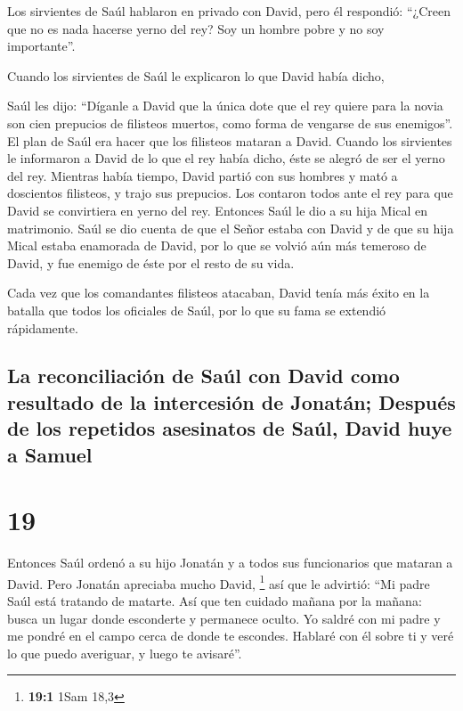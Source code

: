  Los sirvientes de Saúl hablaron en privado con David,
pero él respondió: ``¿Creen que no es nada hacerse yerno del rey? Soy un
hombre pobre y no soy importante''.

 Cuando los sirvientes de Saúl le explicaron lo que David
había dicho,

 Saúl les dijo: ``Díganle a David que la única dote que
el rey quiere para la novia son cien prepucios de filisteos muertos,
como forma de vengarse de sus enemigos''. El plan de Saúl era hacer que
los filisteos mataran a David.  Cuando los sirvientes le
informaron a David de lo que el rey había dicho, éste se alegró de ser
el yerno del rey. Mientras había tiempo,  David partió
con sus hombres y mató a doscientos filisteos, y trajo sus prepucios.
Los contaron todos ante el rey para que David se convirtiera en yerno
del rey. Entonces Saúl le dio a su hija Mical en matrimonio.
 Saúl se dio cuenta de que el Señor estaba con David y de
que su hija Mical estaba enamorada de David,  por lo que
se volvió aún más temeroso de David, y fue enemigo de éste por el resto
de su vida.

 Cada vez que los comandantes filisteos atacaban, David
tenía más éxito en la batalla que todos los oficiales de Saúl, por lo
que su fama se extendió rápidamente.

\hypertarget{la-reconciliaciuxf3n-de-sauxfal-con-david-como-resultado-de-la-intercesiuxf3n-de-jonatuxe1n-despuuxe9s-de-los-repetidos-asesinatos-de-sauxfal-david-huye-a-samuel}{%
\subsection{La reconciliación de Saúl con David como resultado de la
intercesión de Jonatán; Después de los repetidos asesinatos de Saúl,
David huye a
Samuel}\label{la-reconciliaciuxf3n-de-sauxfal-con-david-como-resultado-de-la-intercesiuxf3n-de-jonatuxe1n-despuuxe9s-de-los-repetidos-asesinatos-de-sauxfal-david-huye-a-samuel}}

\hypertarget{section-18}{%
\section{19}\label{section-18}}

 Entonces Saúl ordenó a su hijo Jonatán y a todos sus
funcionarios que mataran a David. Pero Jonatán apreciaba mucho David,
\footnote{\textbf{19:1} 1Sam 18,3}  así que le advirtió:
``Mi padre Saúl está tratando de matarte. Así que ten cuidado mañana por
la mañana: busca un lugar donde esconderte y permanece oculto.
 Yo saldré con mi padre y me pondré en el campo cerca de
donde te escondes. Hablaré con él sobre ti y veré lo que puedo
averiguar, y luego te avisaré''.

